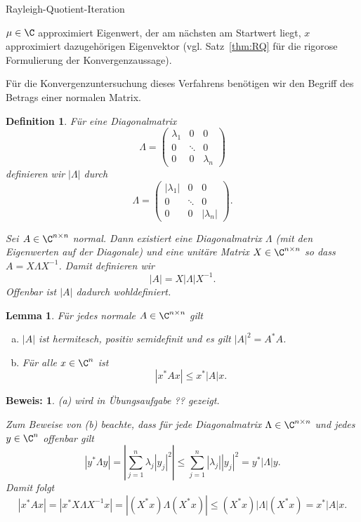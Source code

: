 \documentclass[
]{mycourse}
\theoremstyle{mythm}
\newtheorem{lemma}[theorem]{Lemma}
\newtheorem{definition}[theorem]{Definition}
\theoremstyle{break}
\newtheorem*{beweis}{Beweis:}
\newcommand{\norm}[1]{\left\Vert#1\right\Vert}		%
\begin{document}
\begin{algorithm}
\caption{Rayleigh-Quotient-Iteration}
\label{algo:RQ_Iteration}
\begin{algorithmic}
\REPEAT
{}
\STATE{$x:=\tilde x / \norm{\tilde x}$}
\RETURN $\mu\in \C$ approximiert Eigenwert, der am nächsten am Startwert liegt, $x$ approximiert dazugehörigen
Eigenvektor (vgl. Satz~\ref{thm:RQ} für die rigorose Formulierung der Konvergenzaussage).
\end{algorithmic}
\end{algorithm}

Für die Konvergenzuntersuchung dieses Verfahrens benötigen wir den Begriff des Betrags einer normalen Matrix.
\begin{definition}
Für eine Diagonalmatrix 
\[
\Lambda=\begin{pmatrix} \lambda_1 & 0 & 0\\ 0 & \ddots & 0\\ 0 & 0 & \lambda_n\end{pmatrix}
\]
definieren wir $|\Lambda|$ durch
\[
\Lambda=\begin{pmatrix} |\lambda_1| & 0 & 0\\ 0 & \ddots & 0\\ 0 & 0 & |\lambda_n| \end{pmatrix}.
\]

Sei $A \in \C^{n\times n}$ normal. Dann existiert eine Diagonalmatrix $\Lambda$ (mit den Eigenwerten auf der Diagonale)
und eine unitäre Matrix $X\in \C^{n\times n}$ so dass $A=X \Lambda X^{-1}$.
Damit definieren wir
\[
|A|=X |\Lambda| X^{-1}.
\]
Offenbar ist $|A|$ dadurch wohldefiniert.
\end{definition}

\begin{lemma}\label{lemma:betrag}
Für jedes normale $A\in \C^{n\times n}$ gilt
\begin{enumerate}[(a)]
\item $|A|$ ist hermitesch, positiv semidefinit und es gilt $|A|^2=A^* A$.
\item Für alle $x\in \C^n$ ist
\[
|x^* A x | \leq x^* |A| x.
\]
\end{enumerate}
\end{lemma}
\begin{beweis}
(a) wird in Übungsaufgabe ?? gezeigt.

Zum Beweise von (b) beachte, dass für jede Diagonalmatrix $\Lambda\in \C^{n\times n}$ und jedes
$y\in \C^n$ offenbar gilt
\[
|y^* \Lambda y|=\left| \sum_{j=1}^n \lambda_j |y_j|^2\right| \leq \sum_{j=1}^n |\lambda_j| |y_j|^2 = y^* |\Lambda| y.
\]
Damit folgt 
\[
|x^* A x | = | x^* X \Lambda X^{-1} x | = | (X^*x) \Lambda (X^* x)| \leq (X^* x) |\Lambda| (X^* x) =  x^* |A| x.
\]
\end{beweis}
\end{document}
